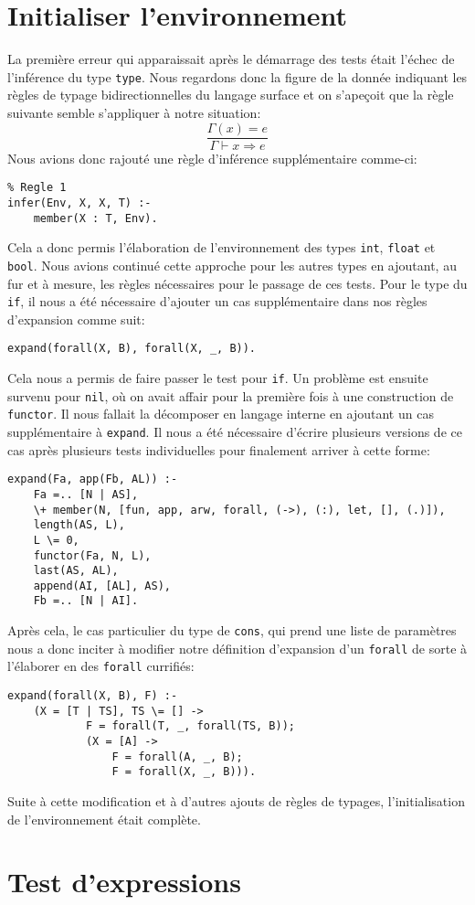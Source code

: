 \documentclass[12pt, titlepage]{article}
\begin{document}
\section{Initialiser l'environnement}
La première erreur qui apparaissait après le démarrage des tests était l'échec
de l'inférence du type \texttt{type}. Nous regardons donc la figure de la
donnée indiquant les règles de typage bidirectionnelles du langage surface et
on s'apeçoit que la règle suivante semble s'appliquer à notre situation:
\begin{equation*}
    \frac {\Gamma(x) = e} {\Gamma \vdash x \Rightarrow e}
\end{equation*}
Nous avions donc rajouté une règle d'inférence supplémentaire comme-ci:
\begin{lstlisting}
% Regle 1
infer(Env, X, X, T) :-
    member(X : T, Env).
\end{lstlisting}
Cela a donc permis l'élaboration de l'environnement des types \texttt{int},
\texttt{float} et \texttt{bool}. Nous avions continué cette approche pour les
autres types en ajoutant, au fur et à mesure, les règles nécessaires pour le
passage de ces tests. Pour le type du \texttt{if}, il nous a été nécessaire
d'ajouter un cas supplémentaire dans nos règles d'expansion comme suit:
\begin{lstlisting}
expand(forall(X, B), forall(X, _, B)).
\end{lstlisting}
Cela nous a permis de faire passer le test pour \texttt{if}. Un problème est
ensuite survenu pour \texttt{nil}, où on avait affair pour la première fois
à une construction de \texttt{functor}. Il nous fallait la décomposer en
langage interne en ajoutant un cas supplémentaire à \texttt{expand}. Il nous a
été nécessaire d'écrire plusieurs versions de ce cas après plusieurs tests
individuelles pour finalement arriver à cette forme:
\begin{lstlisting}
expand(Fa, app(Fb, AL)) :-
    Fa =.. [N | AS],
    \+ member(N, [fun, app, arw, forall, (->), (:), let, [], (.)]),
    length(AS, L),
    L \= 0,
    functor(Fa, N, L),
    last(AS, AL),
    append(AI, [AL], AS),
    Fb =.. [N | AI].
\end{lstlisting}
Après cela, le cas particulier du type de \texttt{cons}, qui prend une liste de
paramètres nous a donc inciter à modifier notre définition d'expansion d'un
\texttt{forall} de sorte à l'élaborer en des \texttt{forall} currifiés:
\begin{lstlisting}
expand(forall(X, B), F) :-
    (X = [T | TS], TS \= [] ->
            F = forall(T, _, forall(TS, B));
            (X = [A] ->
                F = forall(A, _, B);
                F = forall(X, _, B))).
\end{lstlisting}
Suite à cette modification et à d'autres ajouts de règles de typages,
l'initialisation de l'environnement était complète.
\section{Test d'expressions}
\end{document}
